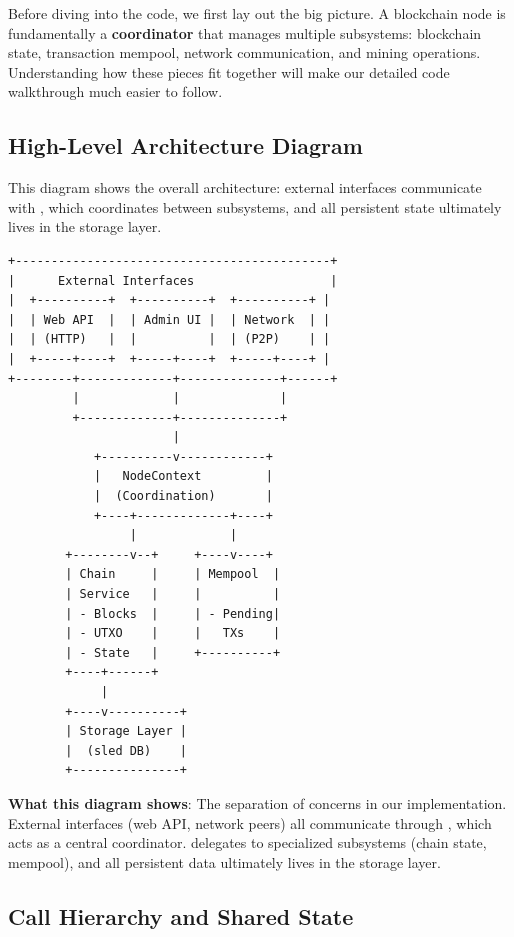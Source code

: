 Before diving into the code, we first lay out the big picture. A blockchain node is fundamentally a \textbf{coordinator} that manages multiple subsystems: blockchain state, transaction mempool, network communication, and mining operations. Understanding how these pieces fit together will make our detailed code walkthrough much easier to follow.

\subsection{High-Level Architecture Diagram}
\label{sec:ch09-8-arch-diagram}

This diagram shows the overall architecture: external interfaces communicate with , which coordinates between subsystems, and all persistent state ultimately lives in the storage layer.

\begin{verbatim}
+--------------------------------------------+
|      External Interfaces                   |
|  +----------+  +----------+  +----------+ |
|  | Web API  |  | Admin UI |  | Network  | |
|  | (HTTP)   |  |          |  | (P2P)    | |
|  +-----+----+  +-----+----+  +-----+----+ |
+--------+-------------+--------------+------+
         |             |              |
         +-------------+--------------+
                       |
            +----------v------------+
            |   NodeContext         |
            |  (Coordination)       |
            +----+-------------+----+
                 |             |
        +--------v--+     +----v----+
        | Chain     |     | Mempool  |
        | Service   |     |          |
        | - Blocks  |     | - Pending|
        | - UTXO    |     |   TXs    |
        | - State   |     +----------+
        +----+------+
             |
        +----v----------+
        | Storage Layer |
        |  (sled DB)    |
        +---------------+
\end{verbatim}

\textbf{What this diagram shows}: The separation of concerns in our implementation. External interfaces (web API, network peers) all communicate through , which acts as a central coordinator.  delegates to specialized subsystems (chain state, mempool), and all persistent data ultimately lives in the storage layer.

\subsection{Call Hierarchy and Shared State}
\label{sec:ch09-8-call-hierarchy}

